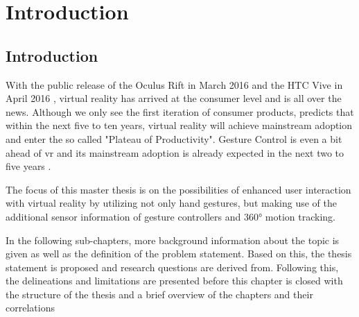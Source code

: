 
\chapter{Introduction} %

\label{ChapterIntroduction} %


\section{Introduction}

With the public release of the Oculus Rift in March 2016 \citep{Oculus2016} and the HTC Vive in April 2016 \citep{Htcvive2016}, virtual reality has arrived at the consumer level and is all over the news. Although we only see the first iteration of consumer products, \cite{Gartner2015} predicts that within the next five to ten years, virtual reality will achieve mainstream adoption and enter the so called "Plateau of Productivity". Gesture Control is even a bit ahead of \gls{vr} and its mainstream adoption is already expected in the next two to five years \citep{Gartner2015}.

The focus of this master thesis is on the possibilities of enhanced user interaction with virtual reality by utilizing not only hand gestures, but making use of the additional sensor information of gesture controllers and 360° motion tracking.

In the following sub-chapters, more background information about the topic is given as well as the definition of the problem statement. Based on this, the thesis statement is proposed and research questions are derived from. Following this, the delineations and limitations are presented before this chapter is closed with the structure of the thesis and a brief overview of the chapters and their correlations



